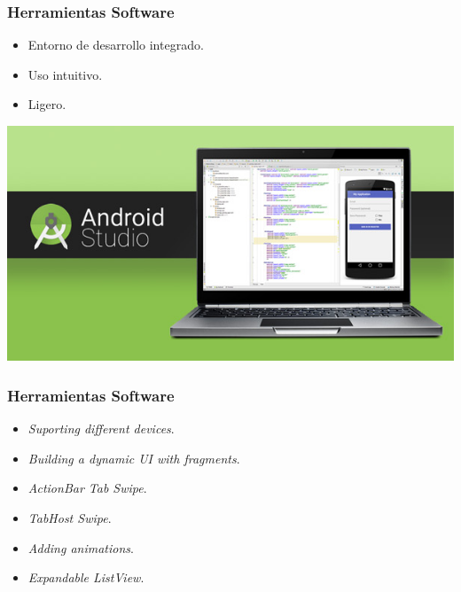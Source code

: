 \begin{frame}
	\frametitle{Herramientas Software}
		\begin{itemize}
			\item Entorno de desarrollo integrado.
			\item Uso intuitivo.
			\item Ligero.
		\end{itemize}
	\endblock{}
	\vfill 
	\begin{center}
		\includegraphics[width=0.8\linewidth]{Images/AndroidStudio}
	\end{center}
\end{frame}

\begin{frame}
	\frametitle{Herramientas Software}
		\begin{itemize}
			\item {\it Suporting different devices}.
			\item {\it Building a dynamic UI with fragments}.
			\item {\it ActionBar Tab Swipe}.
			\item {\it TabHost Swipe}.
			\item {\it Adding animations}.
			\item {\it Expandable ListView}.
		\end{itemize}
	\endblock{}
\end{frame}


